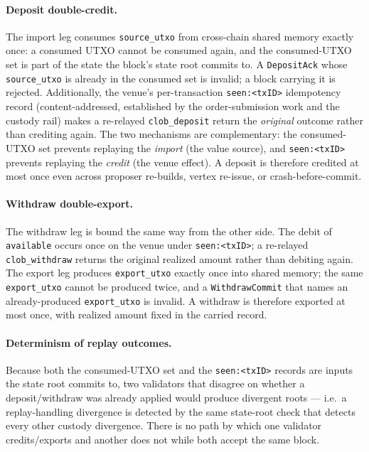 \paragraph{Deposit double-credit.} The import leg consumes
\texttt{source\_utxo} from cross-chain shared memory exactly once: a
consumed UTXO cannot be consumed again, and the consumed-UTXO set is
part of the state the block's state root commits to. A
\texttt{DepositAck} whose \texttt{source\_utxo} is already in the
consumed set is invalid; a block carrying it is rejected. Additionally,
the venue's per-transaction \texttt{seen:<txID>} idempotency record
(content-addressed, established by the order-submission work and the
custody rail) makes a re-relayed \texttt{clob\_deposit} return the
\emph{original} outcome rather than crediting again. The two mechanisms
are complementary: the consumed-UTXO set prevents replaying the
\emph{import} (the value source), and \texttt{seen:<txID>} prevents
replaying the \emph{credit} (the venue effect). A deposit is therefore
credited at most once even across proposer re-builds, vertex re-issue,
or crash-before-commit.

\paragraph{Withdraw double-export.} The withdraw leg is bound the same
way from the other side. The debit of \texttt{available} occurs once on
the venue under \texttt{seen:<txID>}; a re-relayed \texttt{clob\_withdraw}
returns the original realized amount rather than debiting again. The
export leg produces \texttt{export\_utxo} exactly once into shared
memory; the same \texttt{export\_utxo} cannot be produced twice, and a
\texttt{WithdrawCommit} that names an already-produced
\texttt{export\_utxo} is invalid. A withdraw is therefore exported at
most once, with realized amount fixed in the carried record.

\paragraph{Determinism of replay outcomes.} Because both the
consumed-UTXO set and the \texttt{seen:<txID>} records are inputs the
state root commits to, two validators that disagree on whether a
deposit/withdraw was already applied would produce divergent roots ---
i.e.\ a replay-handling divergence is detected by the same state-root
check that detects every other custody divergence. There is no path by
which one validator credits/exports and another does not while both
accept the same block.

